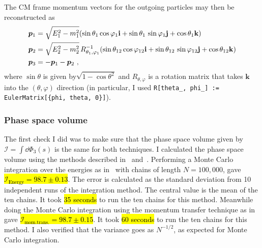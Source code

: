 The CM frame momentum vectors for the outgoing particles may then be reconstructed as
\begin{align}
    \pvec[1] &= \sqrt{E_1^2 - m_1^2} 
    (\sin \theta_1 \cos\varphi_1 \mathbf{i} 
    + \sin \theta_1 \, \sin\varphi_1 \mathbf{j} 
    + \cos\theta_1 \mathbf{k}) \\
    \pvec[2] &= \sqrt{E_2^2 - m_2^2} \, R^{-1}_{\theta_1, \varphi_1} 
    (\sin \theta_{12} \cos\varphi_{12} \mathbf{i} 
    + \sin \theta_{12} \, \sin\varphi_{12} \mathbf{j} 
    + \cos\theta_{12} \mathbf{k}) \\
    \pvec[3] &= - \pvec[1] - \pvec[2] \ ,
\end{align}
where $\sin \theta$ is given by$\sqrt{1 - \cos \theta^2}$ and $R_{\theta, \varphi}$ is a rotation matrix that takes $\mathbf{k}$ into the $(\theta, \varphi)$ direction (in particular, I used \texttt{R[theta\_, phi\_] := EulerMatrix[\{phi, theta, 0\}]}). 

\label{subsec:preliminary-results}

\subsubsection*{Phase space volume}
The first check I did was to make sure that the phase space volume given by $\mathcal{I} = \int \dd \Phi_3(s)$ is the same for both techniques. 
I calculated the phase space volume using the methods described in~ and~.
Performing a Monte Carlo integration over the energies as in~ with chains of length $N = 100,000$, gave \hl{$\mathcal{I}_{\mathrm{Energy}} = 98.7 \pm 0.13$}. 
The error is calculated as the standard deviation from 10 independent runs of the integration method. 
The central value is the mean of the ten chains. 
It took \hl{35 seconds} to run the ten chains for this method.
Meanwhile doing the Monte Carlo integration using the momentum transfer technique as in~ gave 
\hl{$\mathcal{I}_{\mathrm{mom. trans.}} = 98.7 \pm 0.15$}.
It took \hl{$60$ seconds} to run the ten chains for this method.
I also verified that the variance goes as $N^{-1/2}$, as expected for Monte Carlo integration.

